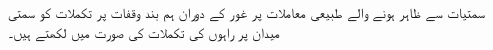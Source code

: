 سمتیات سے ظاہر ہونے والے طبیعی معاملات پر غور کے دوران ہم  بند وقفات پر تکملات کو سمتی میدان پر راہوں کی تکملات کی صورت میں لکھتے ہیں۔
